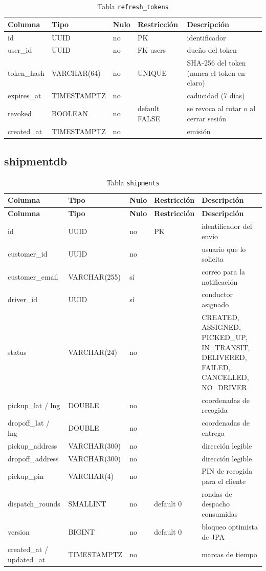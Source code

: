 \documentclass[10pt,letterpaper,twocolumn,oneside]{report}
\newcommand{\pkg}[1]{\texttt{#1}}
\begin{document}
\begin{longtable}{@{}L{3.4cm}L{3.2cm}L{1.2cm}L{3.6cm}L{3.4cm}@{}}
\caption{Tabla \pkg{refresh\_tokens}}\\
\toprule
\textbf{Columna} & \textbf{Tipo} & \textbf{Nulo} & \textbf{Restricción} & \textbf{Descripción}\\
\midrule
\endhead
id & UUID & no & PK & identificador\\
user\_id & UUID & no & FK users & dueño del token\\
token\_hash & VARCHAR(64) & no & UNIQUE & SHA-256 del token (nunca el token en claro)\\
expires\_at & TIMESTAMPTZ & no & & caducidad (7 días)\\
revoked & BOOLEAN & no & default FALSE & se revoca al rotar o al cerrar sesión\\
created\_at & TIMESTAMPTZ & no & & emisión\\
\bottomrule
\end{longtable}

\subsection{shipmentdb}

\begin{longtable}{@{}L{3.2cm}L{3.2cm}L{1.1cm}L{3.4cm}L{3.9cm}@{}}
\caption{Tabla \pkg{shipments}}\\
\toprule
\textbf{Columna} & \textbf{Tipo} & \textbf{Nulo} & \textbf{Restricción} & \textbf{Descripción}\\
\midrule
\endfirsthead
\toprule
\textbf{Columna} & \textbf{Tipo} & \textbf{Nulo} & \textbf{Restricción} & \textbf{Descripción}\\
\midrule
\endhead
id & UUID & no & PK & identificador del envío\\
customer\_id & UUID & no & & usuario que lo solicita\\
customer\_email & VARCHAR(255) & sí & & correo para la notificación\\
driver\_id & UUID & sí & & conductor asignado\\
status & VARCHAR(24) & no & & CREATED, ASSIGNED, PICKED\_UP, IN\_TRANSIT, DELIVERED, FAILED,
CANCELLED, NO\_DRIVER\\
pickup\_lat / lng & DOUBLE & no & & coordenadas de recogida\\
dropoff\_lat / lng & DOUBLE & no & & coordenadas de entrega\\
pickup\_address & VARCHAR(300) & no & & dirección legible\\
dropoff\_address & VARCHAR(300) & no & & dirección legible\\
pickup\_pin & VARCHAR(4) & no & & PIN de recogida para el cliente\\
dispatch\_rounds & SMALLINT & no & default 0 & rondas de despacho consumidas\\
version & BIGINT & no & default 0 & bloqueo optimista de JPA\\
created\_at / updated\_at & TIMESTAMPTZ & no & & marcas de tiempo\\
\bottomrule
\end{longtable}
\end{document}
